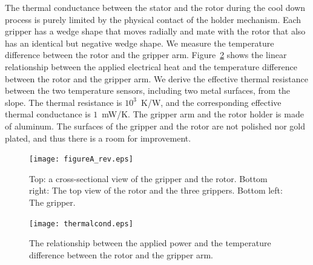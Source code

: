 \documentclass[journal]{IEEEtran}
\begin{document}
The thermal conductance between the stator and the rotor during the cool down process is purely limited by the physical contact of the holder mechanism.
Each gripper has a wedge shape that moves radially and mate with the rotor that also has an identical but negative wedge shape.
We measure the temperature difference between the rotor and the gripper arm.
Figure~\ref{fig:thermalcond} shows the linear relationship between the applied electrical heat and the temperature difference between the rotor and the gripper arm.
We derive the effective thermal resistance between the two temperature sensors, including two metal surfaces, from the slope.
The thermal resistance is $10^{3}$~K/W, and the corresponding effective thermal conductance is $1$~mW/K.
The gripper arm and the rotor holder is made of aluminum.
The surfaces of the gripper and the rotor are not polished nor gold plated, and thus there is a room for improvement.


\begin{figure}[htb]
   \centering
   \texttt{[image: figureA\_rev.eps]} %
   \caption{Top: a cross-sectional view of the gripper and the rotor. Bottom right: The top view of the rotor and the three grippers. Bottom left: The gripper.}
   \label{fig:figureA}
\end{figure}

\begin{figure}[htb]
   \centering
   \texttt{[image: thermalcond.eps]} %
   \caption{The relationship between the applied power and the temperature difference between the rotor and the gripper arm. }
   \label{fig:thermalcond}
\end{figure}
\end{document}
